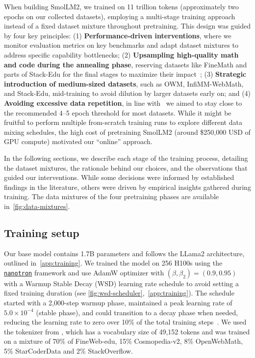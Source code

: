 \documentclass{article}
\theoremstyle{plain}
\theoremstyle{definition}
\theoremstyle{remark}
\begin{document}
When building SmolLM2, we trained on 11 trillion tokens (approximately two epochs on our collected datasets), employing a multi-stage training approach instead of a fixed dataset mixture throughout pretraining. This design was guided by four key principles: (1) \textbf{Performance-driven interventions}, where we monitor evaluation metrics on key benchmarks and adapt dataset mixtures to address specific capability bottlenecks; (2) \textbf{Upsampling high-quality math and code during the annealing phase}, reserving datasets like FineMath and parts of Stack-Edu for the final stages to maximize their impact~\cite{blakeney2024does,olmo2_2024}; (3) \textbf{Strategic introduction of medium-sized datasets}, such as OWM, InfiMM-WebMath, and Stack-Edu, mid-training to avoid dilution by larger datasets early on; and (4) \textbf{Avoiding excessive data repetition}, in line with~\citet{muennighoff2023scaling} we aimed to stay close to the recommended 4–5 epoch threshold for most datasets.
While it might be fruitful to perform multiple from-scratch training runs to explore different data mixing schedules, the high cost of pretraining SmolLM2 (around \$250,000 USD of GPU compute) motivated our ``online'' approach.

In the following sections, we describe each stage of the training process, detailing the dataset mixtures, the rationale behind our choices, and the observations that guided our interventions. While some decisions were informed by established findings in the literature, others were driven by empirical insights gathered during training. The data mixtures of the four pretraining phases are available in~\cref{fig:data-mixtures}.

\subsection{Training setup}
\label{subsec:training-setup}
Our base model contains 1.7B parameters and follows the LLama2 \cite{touvron2023llama} architecture, outlined in~\cref{app:training}. We trained the model on 256 H100s using the \href{https://github.com/huggingface/nanotron/}{\texttt{nanotron}} framework and use AdamW optimizer with $(\beta, \beta_2) = (0.9,0.95)$ with a Warmup Stable Decay (WSD) \cite{hu2024minicpmunveilingpotentialsmall,zhai2022scalingvisiontransformers} learning rate schedule to avoid setting a fixed training duration (see \cref{fig:wsd-scheduler},~\cref{app:training}). The schedule started with a 2,000-step warmup phase, maintained a peak learning rate of $5.0 \times 10^{-4}$ (stable phase), and could transition to a decay phase when needed, reducing the learning rate to zero over 10\% of the total training steps~\cite{hagele2024scaling}.
We used the tokenizer from \citet{allal2024SmolLM},
which has a vocabulary size of 49,152 tokens and was trained on a mixture of 70\% of FineWeb-edu, 15\% Cosmopedia-v2, 8\% OpenWebMath, 5\% StarCoderData and 2\% StackOverflow.
\end{document}
